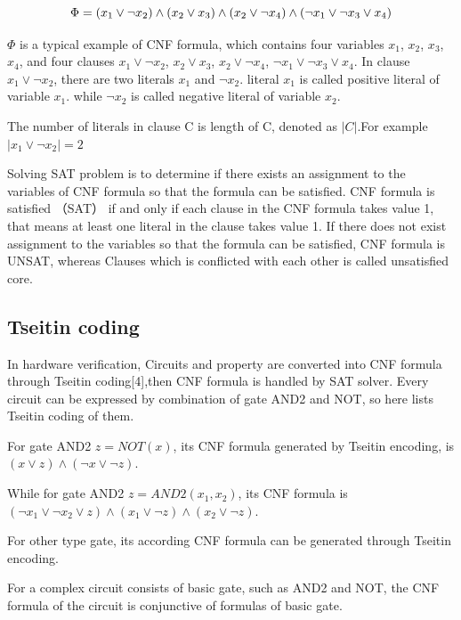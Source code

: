 \documentclass[runningheads,a4paper]{llncs}
\begin{document}
\begin{equation}
\centering \Phi=(x_1\vee \neg x_2)\wedge(x_2\vee x_3)\wedge(x_2\vee \neg x_4)\wedge( \neg x_1\vee \neg x_3\vee x_4)
\end{equation}

$\Phi$ is a typical example of CNF formula, which contains four variables $x_1$, $x_2$, $x_3$, $x_4$, 
and four clauses $x_1\vee \neg x_2$, $x_2\vee x_3$, $x_2\vee \neg x_4$, $ \neg x_1\vee \neg x_3\vee x_4$.
In clause $x_1\vee \neg x_2$, there are two literals $x_1$ and $ \neg x_2$.
literal $x_1$ is called positive literal of variable $x_1$.
while $ \neg x_2$ is called negative literal of variable $x_2$.

The number of literals in clause C is length of C, denoted as $|C|$.For example $| x_1\vee  \neg x_2 | =2$

Solving SAT problem is to determine if there exists an assignment to the variables of CNF formula so that the formula can be satisfied. 
CNF formula is satisfied （SAT） if and only if each clause in the CNF formula takes value 1, that means at least one literal in the clause takes value 1.
If there does not exist assignment to the variables so that the formula can be satisfied, CNF formula is UNSAT, whereas Clauses which is conflicted with each other is called unsatisfied core.
\subsection{Tseitin coding}

In hardware verification, Circuits and property are converted into CNF formula through Tseitin coding[4],then CNF formula is handled by SAT solver. 
Every circuit can be expressed by combination of gate AND2 and NOT, so here lists Tseitin coding of them. 

For gate AND2  $z=NOT(x)$, its CNF formula generated by Tseitin encoding, is  $(x\vee z)\wedge( \neg x\vee \neg z)$.

While for gate AND2 $z=AND2(x_1,x_2)$, its CNF formula is $( \neg x_1\vee \neg x_2\vee z)\wedge(x_1\vee \neg z) \wedge(x_2\vee \neg z)$.

For other type gate, its according CNF formula can be generated through Tseitin encoding.

For a complex circuit consists of basic gate, such as AND2 and NOT, the CNF formula of the circuit is conjunctive of formulas of basic gate.
\end{document}
